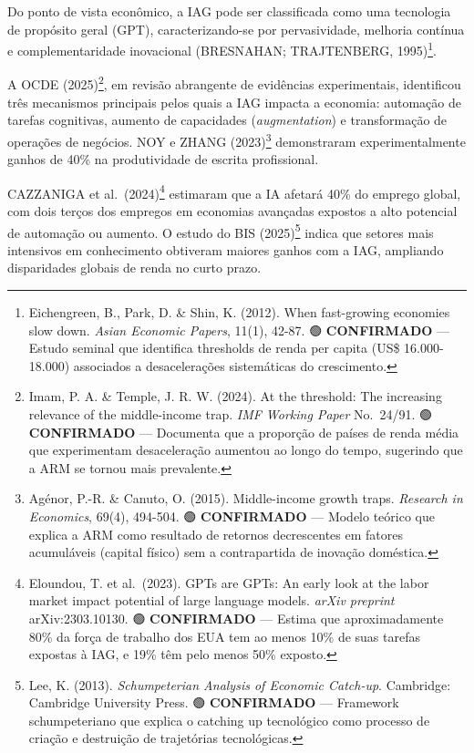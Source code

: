 \documentclass[
  brazilian,
  12pt,
]{article}
\begin{document}
Do ponto de vista econômico, a IAG pode ser classificada como uma tecnologia de propósito geral (GPT), caracterizando-se por pervasividade, melhoria contínua e complementaridade inovacional (BRESNAHAN; TRAJTENBERG, 1995)\footnote{Eichengreen, B., Park, D. \& Shin, K. (2012). When fast-growing economies slow down. \emph{Asian Economic Papers}, 11(1), 42-87. 🟢 \textbf{CONFIRMADO} --- Estudo seminal que identifica thresholds de renda per capita (US\$ 16.000-18.000) associados a desacelerações sistemáticas do crescimento.}.

A OCDE (2025)\footnote{Imam, P. A. \& Temple, J. R. W. (2024). At the threshold: The increasing relevance of the middle-income trap. \emph{IMF Working Paper} No.~24/91. 🟢 \textbf{CONFIRMADO} --- Documenta que a proporção de países de renda média que experimentam desaceleração aumentou ao longo do tempo, sugerindo que a ARM se tornou mais prevalente.}, em revisão abrangente de evidências experimentais, identificou três mecanismos principais pelos quais a IAG impacta a economia: automação de tarefas cognitivas, aumento de capacidades (\emph{augmentation}) e transformação de operações de negócios. NOY e ZHANG (2023)\footnote{Agénor, P.-R. \& Canuto, O. (2015). Middle-income growth traps. \emph{Research in Economics}, 69(4), 494-504. 🟢 \textbf{CONFIRMADO} --- Modelo teórico que explica a ARM como resultado de retornos decrescentes em fatores acumuláveis (capital físico) sem a contrapartida de inovação doméstica.} demonstraram experimentalmente ganhos de 40\% na produtividade de escrita profissional.

CAZZANIGA et al.~(2024)\footnote{Eloundou, T. et al.~(2023). GPTs are GPTs: An early look at the labor market impact potential of large language models. \emph{arXiv preprint} arXiv:2303.10130. 🟢 \textbf{CONFIRMADO} --- Estima que aproximadamente 80\% da força de trabalho dos EUA tem ao menos 10\% de suas tarefas expostas à IAG, e 19\% têm pelo menos 50\% exposto.} estimaram que a IA afetará 40\% do emprego global, com dois terços dos empregos em economias avançadas expostos a alto potencial de automação ou aumento. O estudo do BIS (2025)\footnote{Lee, K. (2013). \emph{Schumpeterian Analysis of Economic Catch-up}. Cambridge: Cambridge University Press. 🟢 \textbf{CONFIRMADO} --- Framework schumpeteriano que explica o catching up tecnológico como processo de criação e destruição de trajetórias tecnológicas.} indica que setores mais intensivos em conhecimento obtiveram maiores ganhos com a IAG, ampliando disparidades globais de renda no curto prazo.
\end{document}
